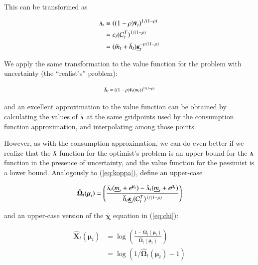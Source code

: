 \documentclass[twocolumn, switch]{article}
\newcommand{\CRRA}{\rho}
\newcommand{\cNrm}{c}
\newcommand{\mNrm}{m}
\newcommand{\vFunc}{\mathbf{v}}
\newcommand{\hNrm}{h}
\newcommand{\MPC}{\boldsymbol{\kappa}}
\newcommand{\MPCmin}{\underline{\MPC}}
\newcommand{\mNrmMin}{\underline{\mNrm}}
\newcommand{\mNrmEx}{\ddot{\mNrm}}
\newcommand{\hNrmEx}{\ddot{\hNrm}}
\newcommand{\logmNrmEx}{\boldsymbol{\mu}}
\newcommand{\logitModRte}{\boldsymbol{\chi}}
\newcommand{\logitModRteFunc}{\bar{\logitModRte}}
\newcommand{\PDVCoverc}{\mathcal{C}}
\newcommand{\vFuncOpt}{\bar{\vFunc}}
\newcommand{\vInv}{{\scriptsize \boldsymbol{\Lambda}}}
\newcommand{\vInvOpt}{\bar{\vInv}}
\newcommand{\vFuncReal}{\hat{\vFunc}}
\newcommand{\vInvReal}{\hat{\vInv}}
\newcommand{\valModRte}{\boldsymbol{\Omega}}
\newcommand{\valModRteReal}{\hat{\valModRte}}
\newcommand{\logitValModRte}{\boldsymbol{X}}
\newcommand{\logitValModRteReal}{\hat{\logitValModRte}}
\begin{document}
This can be transformed as

\begin{equation}
\begin{aligned}
\vInvOpt_{t} &\equiv  \left((1-\CRRA)\vFuncOpt_{t}\right)^{1/(1-\CRRA)}   \\
&= \cNrm_{t}(\PDVCoverc_{t}^{T})^{1/(1-\CRRA)} \\
&= (\mNrmEx_{t}+\hNrmEx_{t})\MPCmin_{t}^{-\CRRA/(1-\CRRA)}
\end{aligned}
\end{equation}

We apply the same transformation to the value function for the problem with
uncertainty (the ``realist's'' problem):

\begin{equation}
\vInvReal_{t} = \left((1-\CRRA)\vFuncReal_{t}(\mNrm_{t})\right)^{1/(1-\CRRA)}
\end{equation}

and an excellent approximation to the value function can be obtained by
calculating the values of $\vInvReal$ at the same gridpoints used by the
consumption function approximation, and interpolating among those points.

However, as with the consumption approximation, we can do even better if we
realize that the $\vInvOpt$ function for the optimist's problem is an upper
bound for the $\vInv$ function in the presence of uncertainty, and the value
function for the pessimist is a lower bound. Analogously to (\ref{eq:koppa}),
define an upper-case

\begin{equation}
\label{eq:KoppaUpper}
\valModRteReal_{t}(\logmNrmEx_{t}) = \left(\frac{\vInvOpt_{t}(\mNrmMin_{t}+e^{\logmNrmEx_{t}})-\vInvReal_{t}(\mNrmMin_{t}+e^{\logmNrmEx_{t}})}{\hNrmEx_{t} \MPCmin_{t} (\PDVCoverc_{t}^{T})^{1/(1-\CRRA)}}\right)
\end{equation}

and an upper-case version of the $\logitModRteFunc$ equation in (\ref{eq:chi}):

\begin{equation}
\label{eq:ChiUpper}
\begin{aligned}
\logitValModRteReal_{t}(\logmNrmEx_{t}) &= \log \left(\frac{1-\valModRteReal_{t}(\logmNrmEx_{t})}{\valModRteReal_{t}(\logmNrmEx_{t})}\right) \\
&= \log \left(1/\valModRteReal_{t}(\logmNrmEx_{t})-1\right)
\end{aligned}
\end{equation}
\end{document}
